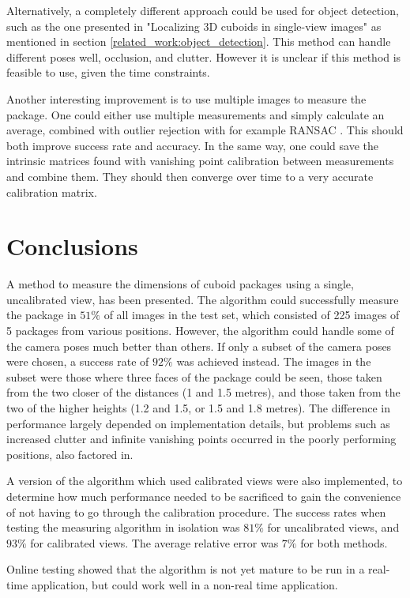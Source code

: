 Alternatively, a completely different approach could be used for object detection, such as the one presented in "Localizing 3D cuboids in single-view images" as mentioned in section \ref{related_work:object_detection}.
This method can handle different poses well, occlusion, and clutter.
However it is unclear if this method is feasible to use, given the time constraints.

Another interesting improvement is to use multiple images to measure the package.
One could either use multiple measurements and simply calculate an average, combined with outlier rejection with for example RANSAC \cite{fischler1981random}.
This should both improve success rate and accuracy.
In the same way, one could save the intrinsic matrices found with vanishing point calibration between measurements and combine them.
They should then converge over time to a very accurate calibration matrix. 


\section{Conclusions}
A method to measure the dimensions of cuboid packages using a single, uncalibrated view, has been presented.
The algorithm could successfully measure the package in $51\%$ of all images in the test set, which consisted of 225 images of 5 packages from various positions.
However, the algorithm could handle some of the camera poses much better than others.
If only a subset of the camera poses were chosen, a success rate of $92\%$ was achieved instead.
The images in the subset were those where three faces of the package could be seen, those taken from the two closer of the distances (1 and 1.5 metres), and those taken from the two of the higher heights (1.2 and 1.5, or 1.5 and 1.8 metres).
The difference in performance largely depended on implementation details, but problems such as increased clutter and infinite vanishing points occurred in the poorly performing positions, also factored in.

A version of the algorithm which used calibrated views were also implemented, to determine how much performance needed to be sacrificed to gain the convenience of not having to go through the calibration procedure.
The success rates when testing the measuring algorithm in isolation was $81\%$ for uncalibrated views, and $93\%$ for calibrated views.
The average relative error was $7\%$ for both methods.

Online testing showed that the algorithm is not yet mature to be run in a real-time application, but could work well in a non-real time application.





